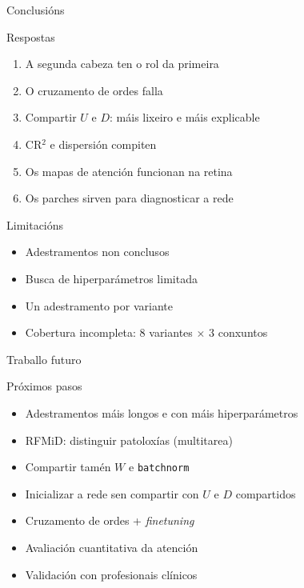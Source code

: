 \documentclass{beamer}
\newcommand{\done}{\rlap{\raisebox{0.3ex}{\hspace{0.4ex}\tiny \ding{52}}}$\square$}
\begin{document}
\begin{frame}{Conclusións}
    \begin{block}{Respostas}
        \begin{enumerate}
            \item[\done] A segunda cabeza ten o rol da primeira \pause
            \item[\done] O cruzamento de ordes falla \pause
            \item[\done] Compartir $U$ e $D$: máis lixeiro e máis explicable \pause
            \item[\done] CR$^2$ e dispersión compiten \pause
            \item[\done] Os mapas de atención funcionan na retina
						\item[\done] Os parches sirven para diagnosticar a rede
        \end{enumerate}
    \end{block}
\end{frame}

\begin{frame}{Limitacións}
    \begin{block}{}
        \begin{itemize}
            \item Adestramentos non conclusos \pause
            \item Busca de hiperparámetros limitada \pause
            \item Un adestramento por variante \pause
            \item Cobertura incompleta: 8 variantes $\times$ 3 conxuntos
        \end{itemize}
    \end{block}
\end{frame}

\begin{frame}{Traballo futuro}
    \begin{block}{Próximos pasos}
        \begin{itemize}[label=$\bullet$, itemsep=6pt]
            \item [$\square$] Adestramentos máis longos e con máis hiperparámetros
            \item [$\square$] RFMiD: distinguir patoloxías (multitarea)
            \item [$\square$] Compartir tamén $W$ e \texttt{batchnorm}
            \item [$\square$] Inicializar a rede sen compartir con $U$ e $D$ compartidos
            \item [$\square$] Cruzamento de ordes + \textit{finetuning}
            \item [$\square$] Avaliación cuantitativa da atención
            \item [$\square$] Validación con profesionais clínicos
        \end{itemize}
    \end{block}
\end{frame}
\end{document}

